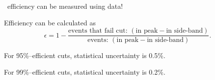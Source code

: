 
\begin{slide*}

\slideframe{}
\huge
{}

\begin{minipage}[t]{\linewidth}
\LARGE

\ys\ efficiency can be measured using data!

\begin{center}
\end{center}




Efficiency can be calculated as
\[ \epsilon = 1 - \frac{\mbox{events that fail cut: }
(\mbox{in peak} - \mbox{in side-band})}{\mbox{events: }
(\mbox{in peak} - \mbox{in side-band})} \mbox{.} \]

For 95\%--efficient cuts, statistical uncertainty is 0.5\%.

For 99\%--efficient cuts, statistical uncertainty is 0.2\%.

\end{minipage}

\end{slide*}


